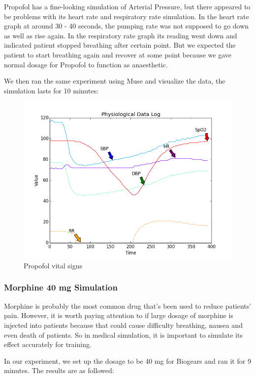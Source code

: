 \documentclass[a4paper]{article}
\begin{document}
Propofol has a fine-looking simulation of Arterial Pressure, but there appeared to be problems with its heart rate and respiratory rate simulation. In the heart rate graph at around 30 - 40 seconds, the pumping rate was not supposed to go down as well as rise again. In the respiratory rate graph its reading went down and indicated patient stopped breathing after certain point. But we expected the patient to start breathing again and recover at some point because we gave normal dosage for Propofol to function as anaesthetic.

We then ran the same experiment using Muse and visualize the data, the simulation lasts for 
10 minutes:

\begin{figure}[p]
    \includegraphics[width=1\textwidth]{cae_propofol_200mg.png}
    \caption{Propofol vital signs}
    \label{fig:awesome_image}
\end{figure}

\subsubsection{Morphine 40 mg Simulation}

Morphine is probably the most common drug that's been used to reduce patients' pain. However, it is worth paying attention to if large dosage of morphine is injected into patients because that could cause difficulty breathing, nausea and even death of patients. So in medical simulation, it is important to simulate its effect accurately for training.

In our experiment, we set up the dosage to be 40 mg for Biogears and ran it for 9 minutes. The results are as followed:
\end{document}

